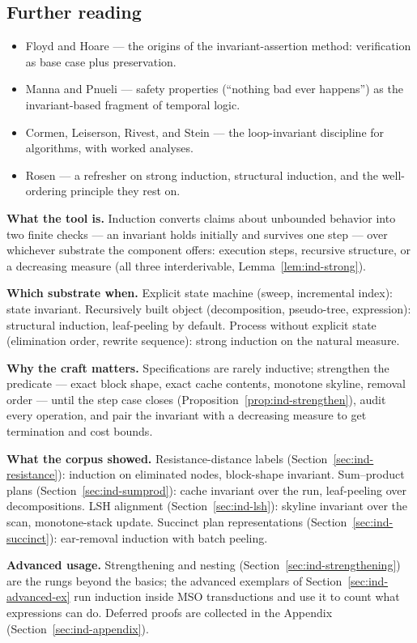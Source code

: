\subsection{Further reading}

\begin{itemize}
\item Floyd \citep{induction-bg1} and Hoare \citep{induction-bg2} --- the origins of
  the invariant-assertion method: verification as base case plus preservation.
\item Manna and Pnueli \citep{induction-bg3} --- safety properties (``nothing bad ever
  happens'') as the invariant-based fragment of temporal logic.
\item Cormen, Leiserson, Rivest, and Stein \citep{induction-bg4} --- the
  loop-invariant discipline for algorithms, with worked analyses.
\item Rosen \citep{induction-bg5} --- a refresher on strong induction, structural
  induction, and the well-ordering principle they rest on.
\end{itemize}

\begin{recap}
\item \textbf{What the tool is.} Induction converts claims about unbounded behavior
  into two finite checks --- an invariant holds initially and survives one step ---
  over whichever substrate the component offers: execution steps, recursive structure,
  or a decreasing measure (all three interderivable,
  Lemma~\ref{lem:ind-strong}).
\item \textbf{Which substrate when.} Explicit state machine (sweep, incremental
  index): state invariant. Recursively built object (decomposition, pseudo-tree,
  expression): structural induction, leaf-peeling by default. Process without explicit
  state (elimination order, rewrite sequence): strong induction on the natural
  measure.
\item \textbf{Why the craft matters.} Specifications are rarely inductive; strengthen
  the predicate --- exact block shape, exact cache contents, monotone skyline,
  removal order --- until the step case closes
  (Proposition~\ref{prop:ind-strengthen}), audit every operation, and pair the
  invariant with a decreasing measure to get termination and cost bounds.
\item \textbf{What the corpus showed.} Resistance-distance labels
  (Section~\ref{sec:ind-resistance}): induction on eliminated nodes, block-shape
  invariant. Sum--product plans (Section~\ref{sec:ind-sumprod}): cache invariant over
  the run, leaf-peeling over decompositions. LSH alignment
  (Section~\ref{sec:ind-lsh}): skyline invariant over the scan, monotone-stack update.
  Succinct plan representations (Section~\ref{sec:ind-succinct}): ear-removal
  induction with batch peeling.
\item \textbf{Advanced usage.} Strengthening and nesting
  (Section~\ref{sec:ind-strengthening}) are the rungs beyond the basics; the advanced
  exemplars of Section~\ref{sec:ind-advanced-ex} run induction inside MSO transductions
  and use it to count what expressions can do. Deferred proofs are collected in the
  Appendix (Section~\ref{sec:ind-appendix}).
\end{recap}

